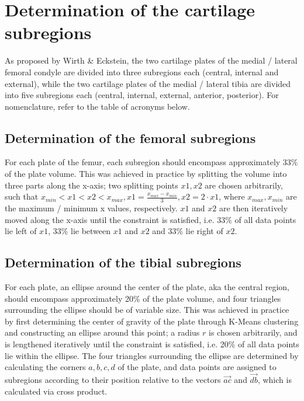 \section{Determination of the cartilage subregions}
\label{sec:Subregions}
As proposed by Wirth \& Eckstein, the two cartilage plates of the medial / lateral femoral condyle are divided into three subregions each (central, internal and external), while the two cartilage plates of the medial / lateral tibia are divided into five subregions each (central, internal, external, anterior, posterior). For nomenclature, refer to the table of acronyms below. 
\subsection{Determination of the femoral subregions}
For each plate of the femur, each subregion should encompass approximately 33\% of the plate volume. This was achieved in practice by splitting the volume into three parts along the x-axis; two splitting points $x1, x2$ are chosen arbitrarily, such that $x_{min} < x1 < x2 < x_{max}, x1 = \frac{x_{max} - x_{min}}{3}, x2 = 2 \cdot x1$, where $x_{max}, x_{min}$ are the maximum / minimum x values, respectively. $x1$ and $x2$ are then iteratively moved along the x-axis until the constraint is satisfied, i.e. 33\% of all data points lie left of $x1$, 33\% lie between $x1$ and $x2$ and 33\% lie right of $x2$.
\subsection{Determination of the tibial subregions}
For each plate, an ellipse around the center of the plate, aka the central region, should encompass approximately 20\% of the plate volume, and four triangles surrounding the ellipse should be of variable size. This was achieved in practice by first determining the center of gravity of the plate through K-Means clustering and constructing an ellipse around this point; a radius $r$ is chosen arbitrarily, and is lengthened iteratively until the constraint is satisfied, i.e. 20\% of all data points lie within the ellipse. The four triangles surrounding the ellipse are determined by calculating the corners $a, b, c, d$ of the plate, and data points are assigned to subregions according to their position relative to the vectors $\vec{ac}$ and $\vec{db}$, which is calculated via cross product.

